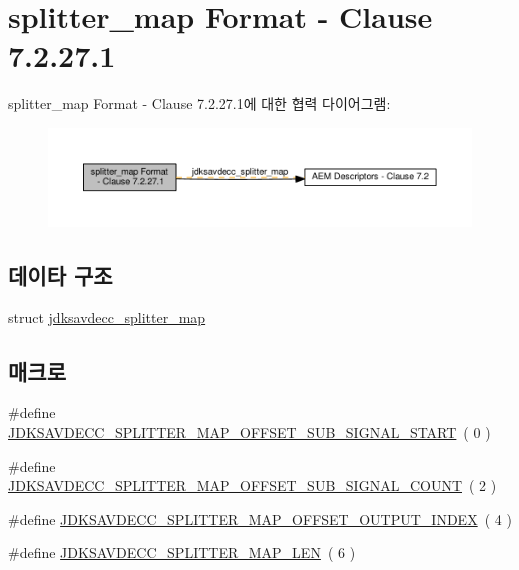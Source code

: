 \hypertarget{group__splitter__map}{}\section{splitter\+\_\+map Format -\/ Clause 7.2.27.1}
\label{group__splitter__map}
splitter\+\_\+map Format -\/ Clause 7.2.27.1에 대한 협력 다이어그램\+:
\nopagebreak
\begin{figure}[H]
\begin{center}
\leavevmode
\includegraphics[width=350pt]{group__splitter__map}
\end{center}
\end{figure}
\subsection*{데이타 구조}
\begin{DoxyCompactItemize}
\item 
struct \hyperlink{structjdksavdecc__splitter__map}{jdksavdecc\+\_\+splitter\+\_\+map}
\end{DoxyCompactItemize}
\subsection*{매크로}
\begin{DoxyCompactItemize}
\item 
\#define \hyperlink{group__splitter__map_gaab9084d27a963b0846d3484e3fb5b412}{J\+D\+K\+S\+A\+V\+D\+E\+C\+C\+\_\+\+S\+P\+L\+I\+T\+T\+E\+R\+\_\+\+M\+A\+P\+\_\+\+O\+F\+F\+S\+E\+T\+\_\+\+S\+U\+B\+\_\+\+S\+I\+G\+N\+A\+L\+\_\+\+S\+T\+A\+RT}~( 0 )
\item 
\#define \hyperlink{group__splitter__map_ga55178ac07bef18ceef343f6feca0036b}{J\+D\+K\+S\+A\+V\+D\+E\+C\+C\+\_\+\+S\+P\+L\+I\+T\+T\+E\+R\+\_\+\+M\+A\+P\+\_\+\+O\+F\+F\+S\+E\+T\+\_\+\+S\+U\+B\+\_\+\+S\+I\+G\+N\+A\+L\+\_\+\+C\+O\+U\+NT}~( 2 )
\item 
\#define \hyperlink{group__splitter__map_gad8b95ea5fd87ee76b96c5deac7cdcd8a}{J\+D\+K\+S\+A\+V\+D\+E\+C\+C\+\_\+\+S\+P\+L\+I\+T\+T\+E\+R\+\_\+\+M\+A\+P\+\_\+\+O\+F\+F\+S\+E\+T\+\_\+\+O\+U\+T\+P\+U\+T\+\_\+\+I\+N\+D\+EX}~( 4 )
\item 
\#define \hyperlink{group__splitter__map_gac90305e6d1ee735d3aac275d9feeb836}{J\+D\+K\+S\+A\+V\+D\+E\+C\+C\+\_\+\+S\+P\+L\+I\+T\+T\+E\+R\+\_\+\+M\+A\+P\+\_\+\+L\+EN}~( 6 )
\end{DoxyCompactItemize}
